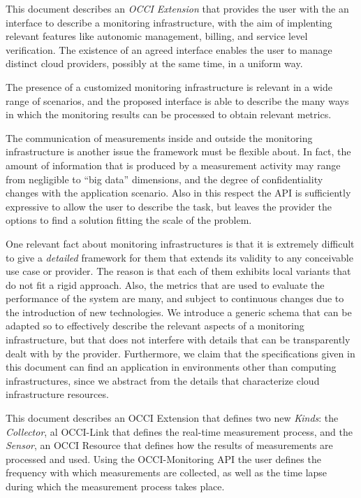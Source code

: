 \documentclass[10pt,a4paper]{article}
\begin{document}
This document describes an {\em OCCI Extension} that provides the user with the an interface to describe a monitoring infrastructure, with the aim of implenting relevant features like autonomic management, billing, and service level verification. The existence of an agreed interface enables the user to manage distinct cloud providers, possibly at the same time, in a uniform way.

The presence of a customized monitoring infrastructure is relevant in a wide range of scenarios, and the proposed interface is able to describe the many ways in which the monitoring results can be processed to obtain relevant metrics.

The communication of measurements inside and outside the monitoring infrastructure is another issue the framework must be flexible about. In fact, the amount of information that is produced by a measurement activity may range from negligible to ``big data'' dimensions, and the degree of confidentiality changes with the application scenario. Also in this respect the API is sufficiently expressive to allow the user to describe the task, but leaves the provider the options to find a solution fitting the scale of the problem.

One relevant fact about monitoring infrastructures is that it is extremely difficult to give a {\em detailed} framework for them that extends its validity to any conceivable use case or provider. The reason is that each of them exhibits local variants that do not fit a rigid approach. Also, the metrics that are used to evaluate the performance of the system are many, and subject to continuous changes due to the introduction of new technologies. We introduce a generic schema that can be adapted so to effectively describe the relevant aspects of a monitoring infrastructure, but that does not interfere with details that can be transparently dealt with by the provider. Furthermore, we claim that the specifications given in this document can find an application in environments other than computing infrastructures, since we abstract from the details that characterize cloud infrastructure resources.

This document describes an OCCI Extension that defines two new {\em Kinds}: the {\em Collector}, al OCCI-Link that defines the real-time measurement process, and the {\em Sensor}, an OCCI Resource that defines how the results of measurements are processed and used. Using the OCCI-Monitoring API the user defines the frequency with which measurements are collected, as well as the time lapse during which the measurement process takes place.
\end{document}

